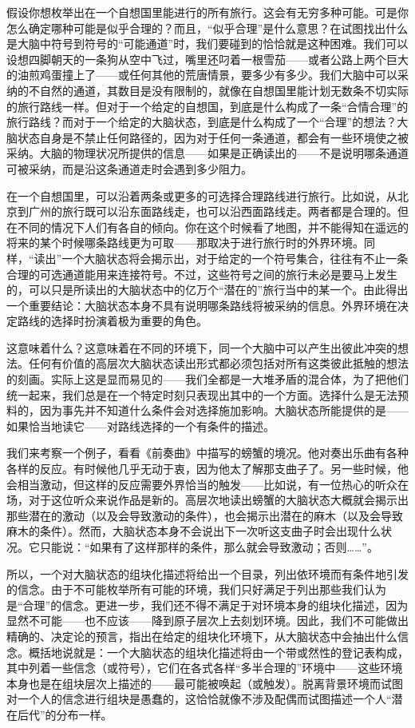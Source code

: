 假设你想枚举出在一个自想国里能进行的所有旅行。这会有无穷多种可能。可是你怎么确定哪种可能是似乎合理的？而且，“似乎合理”是什么意思？在试图找出什么是大脑中符号到符号的“可能通道”时，我们要碰到的恰恰就是这种困难。我们可以设想四脚朝天的一条狗从空中飞过，嘴里还叼着一根雪茄——或者公路上两个巨大的油煎鸡蛋撞上了——或任何其他的荒唐情景，要多少有多少。我们大脑中可以采纳的不自然的通道，其数目是没有限制的，就像在自想国里能计划无数条不切实际的旅行路线一样。但对于一个给定的自想国，到底是什么构成了一条“合情合理”的旅行路线？而对于一个给定的大脑状态，到底是什么构成了一个“合理”的想法？大脑状态自身是不禁止任何路径的，因为对于任何一条通道，都会有一些环境使之被采纳。大脑的物理状况所提供的信息——如果是正确读出的——不是说明哪条通道可被采纳，而是沿这条通道走时会遇到多少阻力。

在一个自想国里，可以沿着两条或更多的可选择合理路线进行旅行。比如说，从北京到广州的旅行既可以沿东面路线走，也可以沿西面路线走。两者都是合理的。但在不同的情况下人们有各自的倾向。你在这个时候看了地图，并不能得知在遥远的将来的某个时候哪条路线更为可取——那取决于进行旅行时的外界环境。同样，“读出”一个大脑状态将会揭示出，对于给定的一个符号集合，往往有不止一条合理的可选通道能用来连接符号。不过，这些符号之间的旅行未必是要马上发生的，可以只是所读出的大脑状态中的亿万个“潜在的”旅行当中的某一个。由此得出一个重要结论：大脑状态本身不具有说明哪条路线将被采纳的信息。外界环境在决定路线的选择时扮演着极为重要的角色。

这意味着什么？这意味着在不同的环境下，同一个大脑中可以产生出彼此冲突的想法。任何有价值的高层次大脑状态读出形式都必须包括对所有这类彼此抵触的想法的刻画。实际上这是显而易见的——我们全都是一大堆矛盾的混合体，为了把他们统一起来，我们总是在一个特定时刻只表现出其中的一个方面。选择什么是无法预料的，因为事先并不知道什么条件会对选择施加影响。大脑状态所能提供的是——如果恰当地读它——对路线选择的一个有条件的描述。

我们来考察一个例子，看看《前奏曲》中描写的螃蟹的境况。他对奏出乐曲有各种各样的反应。有时候他几乎无动于衷，因为他太了解那支曲子了。另一些时候，他会相当激动，但这样的反应需要外界恰当的触发——比如说，有一位热心的听众在场，对于这位听众来说作品是新的。高层次地读出螃蟹的大脑状态大概就会揭示出那些潜在的激动（以及会导致激动的条件），也会揭示出潜在的麻木（以及会导致麻木的条件）。然而，大脑状态本身不会说出下一次听这支曲子时会出现什么状况。它只能说：“如果有了这样那样的条件，那么就会导致激动；否则……”。

所以，一个对大脑状态的组块化描述将给出一个目录，列出依环境而有条件地引发的信念。由于不可能枚举所有可能的环境，我们只好满足于列出那些我们认为是“合理”的信念。更进一步，我们还不得不满足于对环境本身的组块化描述，因为显然不可能——也不应该——降到原子层次上去刻划环境。因此，我们不可能做出精确的、决定论的预言，指出在给定的组块化环境下，从大脑状态中会抽出什么信念。概括地说就是：一个大脑状态的组块化描述将由一个带或然性的登记表构成，其中列着一些信念（或符号），它们在各式各样“多半合理的”环境中——这些环境本身也是在组块层次上描述的——最可能被唤起（或触发）。脱离背景环境而试图对一个人的信念进行组块是愚蠢的，这恰恰就像不涉及配偶而试图描述一个人“潜在后代”的分布一样。

